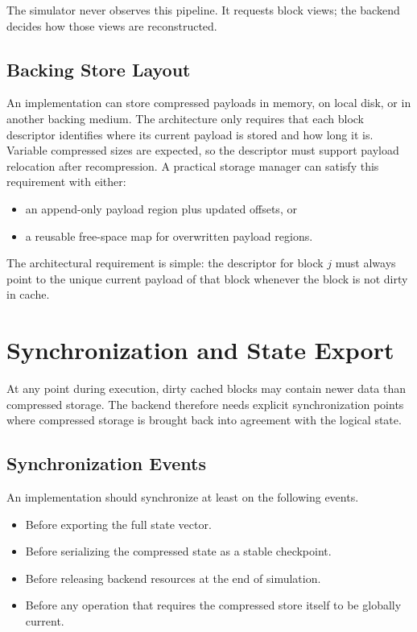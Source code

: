 \documentclass[runningheads]{llncs}
\begin{document}
The simulator never observes this pipeline. It requests block views; the backend decides how those views are reconstructed.

\subsection{Backing Store Layout}

An implementation can store compressed payloads in memory, on local disk, or in another backing medium. The architecture only requires that each block descriptor identifies where its current payload is stored and how long it is. Variable compressed sizes are expected, so the descriptor must support payload relocation after recompression. A practical storage manager can satisfy this requirement with either:
\begin{itemize}[leftmargin=1.4em]
  \item an append-only payload region plus updated offsets, or
  \item a reusable free-space map for overwritten payload regions.
\end{itemize}

The architectural requirement is simple: the descriptor for block $j$ must always point to the unique current payload of that block whenever the block is not dirty in cache.

\section{Synchronization and State Export}

At any point during execution, dirty cached blocks may contain newer data than compressed storage. The backend therefore needs explicit synchronization points where compressed storage is brought back into agreement with the logical state.

\subsection{Synchronization Events}

An implementation should synchronize at least on the following events.
\begin{itemize}[leftmargin=1.4em]
  \item Before exporting the full state vector.
  \item Before serializing the compressed state as a stable checkpoint.
  \item Before releasing backend resources at the end of simulation.
  \item Before any operation that requires the compressed store itself to be globally current.
\end{itemize}
\end{document}

